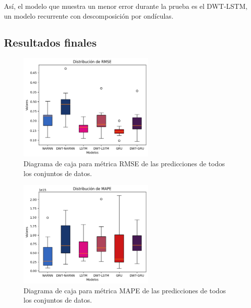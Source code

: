 Así, el modelo que muestra un menor error durante la prueba es el DWT-LSTM, un modelo recurrente con descomposición por ondículas.
\newpage
\subsection{Resultados finales}


\begin{figure}[H]
    \centering
    \includegraphics[width=0.6\textwidth]{Figuras/analisis/RMSE.png}
    \caption{Diagrama de caja para métrica RMSE de las predicciones de todos los conjuntos de datos.} 
    \label{fig:RMSE}
\end{figure}

\begin{figure}[H]
    \centering
    \includegraphics[width=0.6\textwidth]{Figuras/analisis/MAPE.png}
    \caption{Diagrama de caja para métrica MAPE de las predicciones de todos los conjuntos de datos.} 
    \label{fig:MAPE}
\end{figure}

